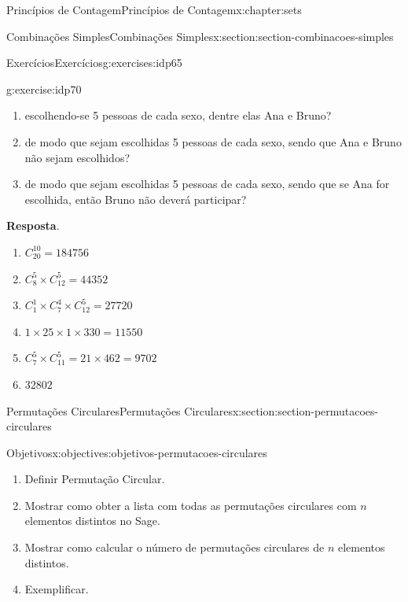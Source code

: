 \documentclass[oneside,10pt,]{book}
\newcommand{\blocktitlefont}{\relax}
\numberwithin{equation}{section}
\begin{document}
\begin{chapterptx}{Princípios de Contagem}{}{Princípios de Contagem}{}{}{x:chapter:sets}
\begin{sectionptx}{Combinações Simples}{}{Combinações Simples}{}{}{x:section:section-combinacoes-simples}
\begin{exercises-subsection}{Exercícios}{}{Exercícios}{}{}{g:exercises:idp65}
\begin{divisionexercise}{3}{}{}{g:exercise:idp70}
\begin{multicols}{1}
\begin{enumerate}[label=(\alph*)]
\item{}escolhendo-se 5 pessoas de cada sexo, dentre elas Ana e Bruno?%
\item{}de modo que sejam escolhidas 5 pessoas de cada sexo, sendo que Ana e Bruno não sejam escolhidos?%
\item{}de modo que sejam escolhidas 5 pessoas de cada sexo, sendo que se Ana for escolhida, então Bruno não deverá participar?%
\end{enumerate}
\end{multicols}
\par\smallskip%
\noindent\textbf{\blocktitlefont Resposta}.\hypertarget{g:answer:idp71}{}\quad{}%
\begin{multicols}{1}
\begin{enumerate}[label=(\alph*)]
\item{}\(\displaystyle C_{20}^{10} = 184756\)%
\item{}\(\displaystyle C_8^5\times C_{12}^5 = 44352 \)%
\item{}\(\displaystyle C_1^1\times C_7^4\times C_12^5 = 27720 \)%
\item{}\(\displaystyle 1\times 25\times 1\times 330 = 11550 \)%
\item{}\(\displaystyle C_7^5\times C_11^5 = 21\times 462 = 9702 \)%
\item{}\(\displaystyle 32802 \)%
\end{enumerate}
\end{multicols}
\end{divisionexercise}%
\end{exercises-subsection}
\end{sectionptx}
%
%
\typeout{************************************************}
\typeout{************************************************}
%
\begin{sectionptx}{Permutações Circulares}{}{Permutações Circulares}{}{}{x:section:section-permutacoes-circulares}
\begin{objectives}{Objetivos}{x:objectives:objetivos-permutacoes-circulares}
%
\begin{enumerate}
\item{}Definir Permutação Circular.%
\item{}Mostrar como obter a lista com todas as permutações circulares com \(n\) elementos distintos no Sage.%
\item{}Mostrar como calcular o número de permutações circulares de \(n\) elementos distintos.%
\item{}Exemplificar.%

\end{enumerate}
\end{objectives}
\end{sectionptx}
\end{chapterptx}
\end{document}
